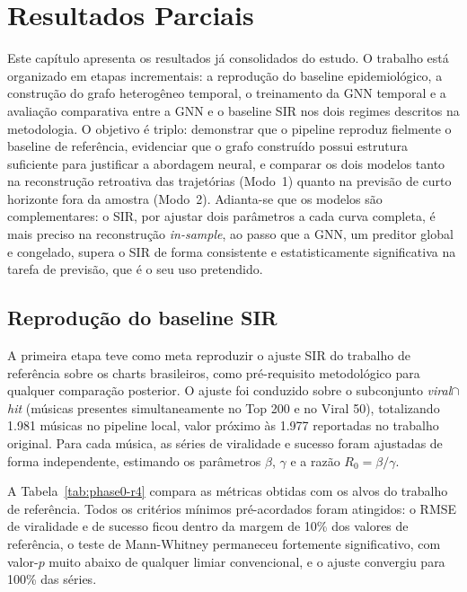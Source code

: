 \chapter{Resultados Parciais}
\label{cap:resultados}

Este capítulo apresenta os resultados já consolidados do estudo. O trabalho está organizado em etapas incrementais: a reprodução do baseline epidemiológico, a construção do grafo heterogêneo temporal, o treinamento da GNN temporal e a avaliação comparativa entre a GNN e o baseline SIR nos dois regimes descritos na metodologia. O objetivo é triplo: demonstrar que o pipeline reproduz fielmente o baseline de referência, evidenciar que o grafo construído possui estrutura suficiente para justificar a abordagem neural, e comparar os dois modelos tanto na reconstrução retroativa das trajetórias (Modo~1) quanto na previsão de curto horizonte fora da amostra (Modo~2). Adianta-se que os modelos são complementares: o SIR, por ajustar dois parâmetros a cada curva completa, é mais preciso na reconstrução \emph{in-sample}, ao passo que a GNN, um preditor global e congelado, supera o SIR de forma consistente e estatisticamente significativa na tarefa de previsão, que é o seu uso pretendido.


\section{Reprodução do baseline SIR}

A primeira etapa teve como meta reproduzir o ajuste SIR do trabalho de referência \citep{oliveira2025brasnam} sobre os charts brasileiros, como pré-requisito metodológico para qualquer comparação posterior. O ajuste foi conduzido sobre o subconjunto \emph{viral$\cap$hit} (músicas presentes simultaneamente no Top 200 e no Viral 50), totalizando 1.981 músicas no pipeline local, valor próximo às 1.977 reportadas no trabalho original. Para cada música, as séries de viralidade e sucesso foram ajustadas de forma independente, estimando os parâmetros $\beta$, $\gamma$ e a razão $R_0 = \beta/\gamma$.

A Tabela~\ref{tab:phase0-r4} compara as métricas obtidas com os alvos do trabalho de referência. Todos os critérios mínimos pré-acordados foram atingidos: o RMSE de viralidade e de sucesso ficou dentro da margem de 10\% dos valores de referência, o teste de Mann-Whitney permaneceu fortemente significativo, com valor-$p$ muito abaixo de qualquer limiar convencional, e o ajuste convergiu para 100\% das séries.

